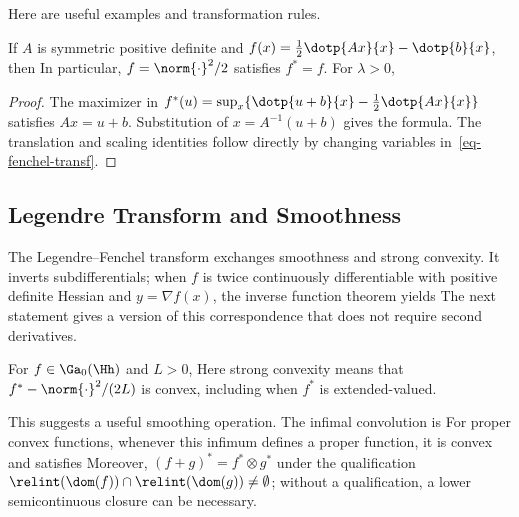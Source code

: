 Here are useful examples and transformation rules.

\begin{prop}\label{eq-example-legendre}
If $A$ is symmetric positive definite and
$f(x)=\frac12\dotp{Ax}{x}-\dotp{b}{x}$, then
In particular, $f=\norm{\cdot}^2/2$ satisfies $f^*=f$. For $\lambda>0$,
\end{prop}
\begin{proof}
The maximizer in $f^*(u)=\sup_x\{\dotp{u+b}{x}-\frac12\dotp{Ax}{x}\}$ satisfies $Ax=u+b$. Substitution of $x=A^{-1}(u+b)$ gives the formula. The translation and scaling identities follow directly by changing variables in~\eqref{eq-fenchel-transf}.
\end{proof}

\subsection{Legendre Transform and Smoothness}

The Legendre--Fenchel transform exchanges smoothness and strong convexity. It inverts subdifferentials; when $f$ is twice continuously differentiable with positive definite Hessian and $y=\nabla f(x)$, the inverse function theorem yields
The next statement gives a version of this correspondence that does not require second derivatives.

\begin{prop}\label{prop-conjugate-smoothness}
For $f\in\Ga_0(\Hh)$ and $L>0$,
Here strong convexity means that $f^*-\norm{\cdot}^2/(2L)$ is convex, including when $f^*$ is extended-valued.
\end{prop}

This suggests a useful smoothing operation. The infimal convolution is
For proper convex functions, whenever this infimum defines a proper function, it is convex and satisfies
Moreover, $(f+g)^*=f^*\otimes g^*$ under the qualification $\relint(\dom(f))\cap\relint(\dom(g))\neq\emptyset$; without a qualification, a lower semicontinuous closure can be necessary.

